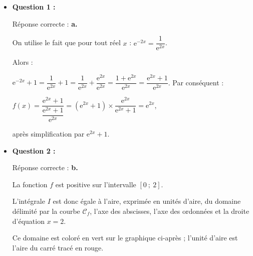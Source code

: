 \begin{corrige}
     \begin{itemize}
          \item \textbf{Question 1 :}
          \par
          Réponse correcte :\quad\textbf{ a.}
          \par
          On utilise le fait que pour tout réel $x$ : ${\text{e}^{-2x}=\dfrac{1}{\text{e}^{2x}}}$.
          \par
          Alors :
          \par
          $\text{e}^{-2x}+1=\dfrac{1}{\text{e}^{2x}}+1=\dfrac{1}{\text{e}^{2x}}+\dfrac{\text{e}^{2x}}{\text{e}^{2x}}=\dfrac{1+\text{e}^{2x}}{\text{e}^{2x}}=\dfrac{\text{e}^{2x}+1}{\text{e}^{2x}}$.
\medskip
          Par conséquent :
          \par
          $f(x)=\dfrac{\text{e}^{2x}+1}{\dfrac{\text{e}^{2x}+1}{\text{e}^{2x}}}=(\text{e}^{2x}+1) \times {\dfrac{\text{e}^{2x}}{\text{e}^{2x}+1}}=\text{e}^{2x}$,
          \par
          après simplification par ${\text{e}^{2x}+1}$.
          \par
          \par
          \item \textbf{Question 2 :}
          \par
          Réponse correcte :\quad\textbf{ b.}
          \par
          La fonction $f$ est positive sur l'intervalle $[0~;~2]$.
          \par
          L'intégrale $I$ est donc égale à l'aire, exprimée en unités d'aire, du domaine délimité par la courbe $\mathscr{C}_f$, l'axe des abscisses, l'axe des ordonnées et la droite d'équation $x=2$.
          \par
          Ce domaine est coloré en vert sur le graphique ci-après ; l'unité d'aire est l'aire du carré tracé en rouge.
          \par
          \begin{center}
               \begin{extern}%

\end{extern}
\end{center}
\end{itemize}
\end{corrige}
